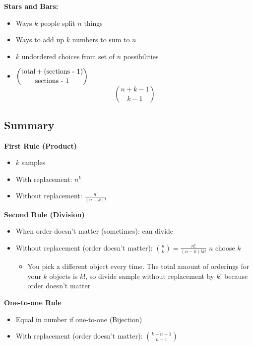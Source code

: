 \documentclass{article}\usepackage{amsmath,amssymb,amsthm,tikz,tkz-graph,color,chngpage,soul,hyperref,csquotes,graphicx,floatrow, listings}\newcommand*{\QEDB}{\hfill\ensuremath{\square}}\newtheorem*{prop}{Proposition}\renewcommand{\theenumi}{\alph{enumi}}\usepackage[shortlabels]{enumitem}\usepackage[nobreak=true]{mdframed}\usetikzlibrary{matrix,calc}\MakeOuterQuote{"}\usepackage[margin=0.75in]{geometry} \newtheorem{theorem}{Theorem}\newcommand{\Z}{\mathbb Z}\newcommand{\R}{\mathbb R}\newcommand{\Q}{\mathbb Q}\newcommand{\N}{\mathbb N}
\begin{document}
\textbf{Stars and Bars:}
\begin{itemize}
    \item Ways $k$ people split $n$ things
    \item Ways to add up $k$ numbers to sum to $n$
    \item $k$ undordered choices from set of $n$ possibilities
    \item $\dbinom{\textrm{total} + \textrm{(sections - 1)}}{\textrm{sections - 1}}$
    \begin{equation}\binom{n+k-1}{k-1}\end{equation}
\end{itemize}
\subsection*{Summary}
\textbf{First Rule (Product)}
\begin{itemize}
    \item $k$ samples
    \item With replacement: $n^k$
    \item Without replacement: $\frac{n!}{(n-k)!}$
\end{itemize}
\textbf{Second Rule (Division)}
\begin{itemize}
    \item When order doesn't matter (sometimes): can divide
    \item Without replacement (order doesn't matter): $\binom{n}{k}=\frac{n!}{(n-k)!k!}$ $n$ choose $k$
    \begin{itemize}
        \item You pick a different object every time. The total amount of orderings for your $k$ objects is $k!$, so divide sample without replacement by $k!$ because order doesn't matter
    \end{itemize}
\end{itemize}
\textbf{One-to-one Rule}
\begin{itemize}
    \item Equal in number if one-to-one (Bijection)
    \item With replacement (order doesn't matter): $\binom{k+n-1}{n-1}$
\end{itemize}
\end{document}
